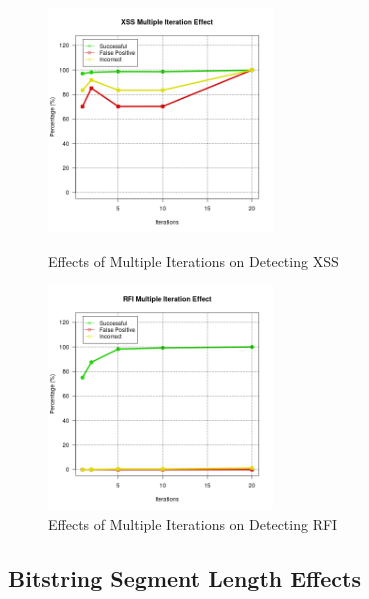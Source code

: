 \begin{appendices}
\begin{figure}[hp]
	\centering
	\includegraphics[height=225px]{./assets/appendix/fullresults/ga/iterations/Results_XSS.png}
	\caption{Effects of Multiple Iterations on Detecting XSS}
	\includegraphics[height=225px]{./assets/appendix/fullresults/ga/iterations/Results_RFI.png}
	\caption{Effects of Multiple Iterations on Detecting RFI}
\end{figure}

\newpage
\subsection{Bitstring Segment Length Effects} \label{app:resSegment}


\end{appendices}
